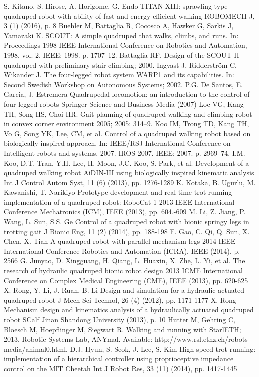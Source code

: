 \documentclass[12pt,a4paper]{ctexart}
\begin{document}
\begin{thebibliography}{99}
     S. Kitano, S. Hirose, A. Horigome, G. Endo
    TITAN-XIII: sprawling-type quadruped robot with ability of fast and energy-efficient walking
    ROBOMECH J, 3 (1) (2016), p. 8
     Buehler M, Battaglia R, Cocosco A, Hawker G, Sarkis J, Yamazaki K. SCOUT: A simple quadruped that walks, climbs, and runs. In: Proceedings 1998 IEEE International Conference on Robotics and Automation, 1998, vol. 2. IEEE; 1998. p. 1707–12.
     Battaglia RF. Design of the SCOUT II quadruped with preliminary stair-climbing; 2000.
     Ingvast J, Ridderström C, Wikander J. The four-legged robot system WARP1 and its capabilities. In: Second Swedish Workshop on Autonomous Systems; 2002.
     P.G. De Santos, E. Garcia, J. Estremera
    Quadrupedal locomotion: an introduction to the control of four-legged robots
    Springer Science and Business Media (2007)
     Loc VG, Kang TH, Song HS, Choi HR. Gait planning of quadruped walking and climbing robot in convex corner environment 2005; 2005: 314–9.
     Koo IM, Trong TD, Kang TH, Vo G, Song YK, Lee, CM, et al. Control of a quadruped walking robot based on biologically inspired approach. In: IEEE/RSJ International Conference on Intelligent robots and systems, 2007. IROS 2007. IEEE; 2007. p. 2969–74.
     I.M. Koo, D.T. Tran, Y.H. Lee, H. Moon, J.C. Koo, S. Park, et al.
    Development of a quadruped walking robot AiDIN-III using biologically inspired kinematic analysis
    Int J Control Autom Syst, 11 (6) (2013), pp. 1276-1289
     K. Kotaka, B. Ugurlu, M. Kawanishi, T. Narikiyo
    Prototype development and real-time trot-running implementation of a quadruped robot: RoboCat-1
    2013 IEEE International Conference Mechatronics (ICM), IEEE (2013), pp. 604.-609
     M. Li, Z. Jiang, P. Wang, L. Sun, S.S. Ge
    Control of a quadruped robot with bionic springy legs in trotting gait
    J Bionic Eng, 11 (2) (2014), pp. 188-198
     F. Gao, C. Qi, Q. Sun, X. Chen, X. Tian
    A quadruped robot with parallel mechanism legs
    2014 IEEE International Conference Robotics and Automation (ICRA), IEEE (2014), p. 2566
     G. Junyao, D. Xingguang, H. Qiang, L. Huaxin, X. Zhe, L. Yi, et al.
    The research of hydraulic quadruped bionic robot design
    2013 ICME International Conference on Complex Medical Engineering (CME), IEEE (2013), pp. 620-625
     X. Rong, Y. Li, J. Ruan, B. Li
    Design and simulation for a hydraulic actuated quadruped robot
    J Mech Sci Technol, 26 (4) (2012), pp. 1171-1177
     X. Rong
    Mechanism design and kinematics analysis of a hydraulically actuated quadruped robot SCalf
    Jinan Shandong University (2013), p. 10
     Hutter M, Gehring C, Bloesch M, Hoepflinger M, Siegwart R. Walking and running with StarlETH; 2013.
     Robotic Systems Lab, ANYmal. Available: http://www.rsl.ethz.ch/robots-media/animal0.html.
     D.J. Hyun, S. Seok, J. Lee, S. Kim
    High speed trot-running: implementation of a hierarchical controller using proprioceptive impedance control on the MIT Cheetah
    Int J Robot Res, 33 (11) (2014), pp. 1417-1445

\end{thebibliography}
\end{document}
